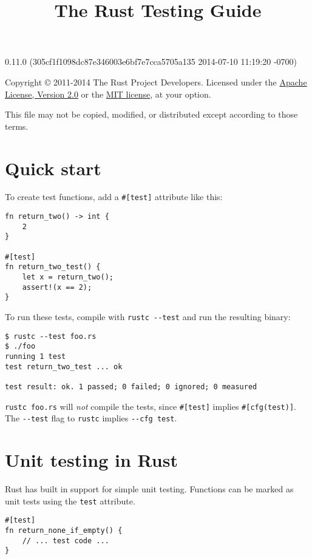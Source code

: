 \documentclass[]{article}
\title{The Rust Testing Guide}
\begin{document}
\maketitle

0.11.0 (305cf1f1098dc87e346003e6bf7e7cca5705a135 2014-07-10 11:19:20 -0700)

Copyright © 2011-2014 The Rust Project Developers. Licensed under the
\href{http://www.apache.org/licenses/LICENSE-2.0}{Apache License,
Version 2.0} or the \href{http://opensource.org/licenses/MIT}{MIT
license}, at your option.

This file may not be copied, modified, or distributed except according
to those terms.

{
\hypersetup{linkcolor=black}
\setcounter{tocdepth}{3}
\tableofcontents
}
\section{Quick start}\label{quick-start}

To create test functions, add a \texttt{\#{[}test{]}} attribute like
this:

\begin{verbatim}
fn return_two() -> int {
    2
}

#[test]
fn return_two_test() {
    let x = return_two();
    assert!(x == 2);
}
\end{verbatim}

To run these tests, compile with \texttt{rustc -\/-test} and run the
resulting binary:

\begin{verbatim}
$ rustc --test foo.rs
$ ./foo
running 1 test
test return_two_test ... ok

test result: ok. 1 passed; 0 failed; 0 ignored; 0 measured
\end{verbatim}

\texttt{rustc foo.rs} will \emph{not} compile the tests, since
\texttt{\#{[}test{]}} implies \texttt{\#{[}cfg(test){]}}. The
\texttt{-\/-test} flag to \texttt{rustc} implies \texttt{-\/-cfg test}.

\section{Unit testing in Rust}\label{unit-testing-in-rust}

Rust has built in support for simple unit testing. Functions can be
marked as unit tests using the \texttt{test} attribute.

\begin{verbatim}
#[test]
fn return_none_if_empty() {
    // ... test code ...
}
\end{verbatim}
\end{document}
